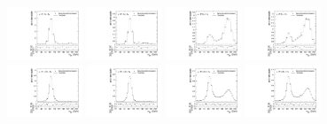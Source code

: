 \begin{figure}[htbp]
  \centering
  \includegraphics[width=0.2\textwidth]{fig/analysis/templateVsReco_res_r0_MJ_mu_HP_bb_LDy.pdf}
  \includegraphics[width=0.2\textwidth]{fig/analysis/templateVsReco_res_r0_MJ_e_HP_bb_LDy.pdf}
  \includegraphics[width=0.2\textwidth]{fig/analysis/templateVsReco_res_r0_MJ_mu_LP_bb_LDy.pdf}
  \includegraphics[width=0.2\textwidth]{fig/analysis/templateVsReco_res_r0_MJ_e_LP_bb_LDy.pdf}\\
  \includegraphics[width=0.2\textwidth]{fig/analysis/templateVsReco_res_r0_MJ_mu_HP_nobb_LDy.pdf}
  \includegraphics[width=0.2\textwidth]{fig/analysis/templateVsReco_res_r0_MJ_e_HP_nobb_LDy.pdf}
  \includegraphics[width=0.2\textwidth]{fig/analysis/templateVsReco_res_r0_MJ_mu_LP_nobb_LDy.pdf}
  \includegraphics[width=0.2\textwidth]{fig/analysis/templateVsReco_res_r0_MJ_e_LP_nobb_LDy.pdf}\\

\end{figure}
